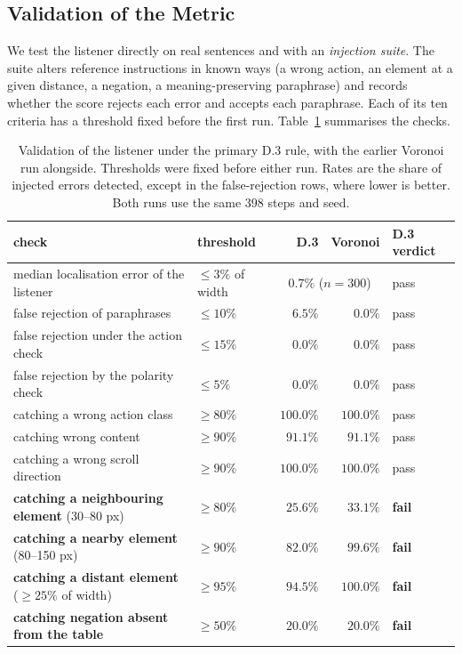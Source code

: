 \documentclass[runningheads,a4paper]{llncs}
\begin{document}
\subsection{Validation of the Metric}
\label{sec:validate}

We test the listener directly on real sentences and with an \emph{injection suite}. The suite alters reference instructions in known ways (a wrong action, an element at a given distance, a negation, a meaning-preserving paraphrase) and records whether the score rejects each error and accepts each paraphrase. Each of its ten criteria has a threshold fixed before the
first run. Table~\ref{tab:valid} summarises the checks.

\begin{table}[t]
\centering
\caption{Validation of the listener under the primary D.3 rule, with the earlier Voronoi
run alongside. Thresholds were fixed before either run. Rates are the share of injected errors detected, except in the false-rejection rows, where lower is better. Both runs use the same $398$ steps and seed.}
\label{tab:valid}
\setlength{\tabcolsep}{4pt}
\begin{tabular}{>{\raggedright\arraybackslash}p{4.5cm}>{\raggedright\arraybackslash}p{1.9cm}rrl}
\toprule
check & threshold & D.3 & Voronoi & D.3 verdict\\
\midrule
median localisation error of the listener & $\le 3\%$ of width & \multicolumn{2}{c}{$0.7\%$ ($n=300$)} & pass\\
false rejection of paraphrases & $\le 10\%$ & $6.5\%$ & $0.0\%$ & pass\\
false rejection under the action check & $\le 15\%$ & $0.0\%$ & $0.0\%$ & pass\\
false rejection by the polarity check & $\le 5\%$ & $0.0\%$ & $0.0\%$ & pass\\
catching a wrong action class & $\ge 80\%$ & $100.0\%$ & $100.0\%$ & pass\\
catching wrong content & $\ge 90\%$ & $91.1\%$ & $91.1\%$ & pass\\
catching a wrong scroll direction & $\ge 90\%$ & $100.0\%$ & $100.0\%$ & pass\\
\textbf{catching a neighbouring element} (30--80 px) & $\ge 80\%$ & $25.6\%$ & $33.1\%$ & \textbf{fail}\\
\textbf{catching a nearby element} (80--150 px) & $\ge 90\%$ & $82.0\%$ & $99.6\%$ & \textbf{fail}\\
\textbf{catching a distant element} ($\ge 25\%$ of width) & $\ge 95\%$ & $94.5\%$ & $100.0\%$ & \textbf{fail}\\
\textbf{catching negation absent from the table} & $\ge 50\%$ & $20.0\%$ & $20.0\%$ & \textbf{fail}\\
\bottomrule
\end{tabular}
\end{table}
\end{document}
